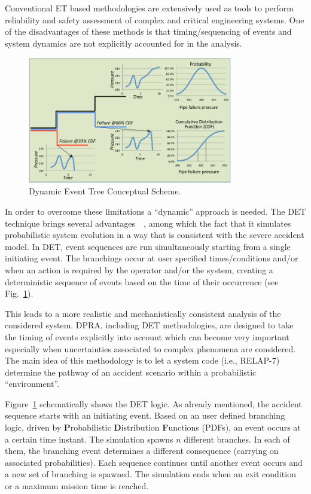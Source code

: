 \label{sec:det}
Conventional ET based methodologies are extensively used as tools to perform reliability and safety assessment of complex and critical engineering systems. 
One of the disadvantages of these methods is that timing/sequencing of events and system dynamics are not explicitly accounted for in the analysis.

\begin{figure}[h] 
  \centering
     \includegraphics[width=0.8\textwidth]{figures/DET_schemeFlow.png}
  \caption{Dynamic Event Tree Conceptual Scheme.}
   \label{fig:DET_schemeFlow}
\end{figure}
In order to overcome these limitations a ``dynamic'' approach is needed. The DET technique brings several advantages~\cite{alfonsiPSA}~\cite{ADAPTHakobyan}, among which the fact that it simulates probabilistic system evolution in a way that is consistent with the severe accident model. In DET,  event sequences are run simultaneously starting from a single initiating event. The branchings occur at user specified times/conditions and/or when an action is required by the operator and/or the system, creating a deterministic sequence of events based on the time of their occurrence (see Fig.~\ref{fig:DET_schemeFlow}). 

This leads to a more realistic and mechanistically consistent analysis of the considered system. DPRA, including  DET methodologies,  are designed to take the timing of events explicitly into account which can become very important especially when uncertainties associated to complex phenomena are considered. \\
The main idea of this methodology is to let a system code (i.e., RELAP-7) determine the pathway of an accident scenario within a probabilistic ``environment''. 

Figure~\ref{fig:DET_schemeFlow} schematically shows the DET logic. As already mentioned, the accident sequence starts with an initiating event. Based on an user defined branching logic, driven by \textbf{P}robabilistic \textbf{D}istribution \textbf{F}unctions (PDFs), an event occurs at a certain time instant. The simulation spawns $n$ different branches. In each of them, the branching event determines a different consequence (carrying on associated probabilities). Each sequence continues until another event occurs and a new set of branching is spawned. The simulation ends when an exit condition or a maximum mission time is reached.
